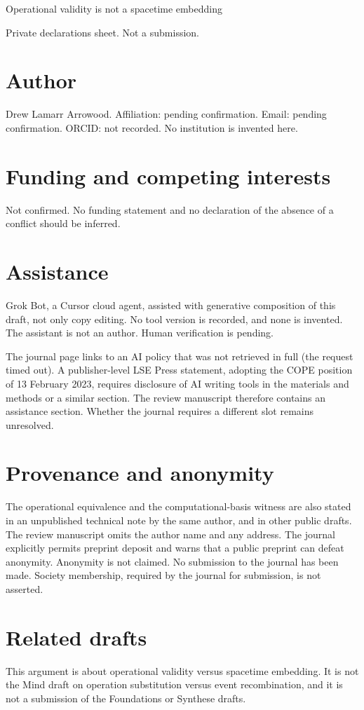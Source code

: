 \documentclass[11pt]{article}
\begin{document}
\begin{center}
{\Large Operational validity is not a spacetime embedding\par}
\vspace{1em}
Private declarations sheet. Not a submission.\par
\end{center}
\section*{Author}
Drew Lamarr Arrowood. Affiliation: pending confirmation. Email: pending confirmation. ORCID: not recorded. No institution is invented here.

\section*{Funding and competing interests}
Not confirmed. No funding statement and no declaration of the absence of a conflict should be inferred.

\section*{Assistance}
Grok Bot, a Cursor cloud agent, assisted with generative composition of this draft, not only copy editing. No tool version is recorded, and none is invented. The assistant is not an author. Human verification is pending.

The journal page links to an AI policy that was not retrieved in full (the request timed out). A publisher-level LSE Press statement, adopting the COPE position of 13 February 2023, requires disclosure of AI writing tools in the materials and methods or a similar section. The review manuscript therefore contains an assistance section. Whether the journal requires a different slot remains unresolved.

\section*{Provenance and anonymity}
The operational equivalence and the computational-basis witness are also stated in an unpublished technical note by the same author, and in other public drafts. The review manuscript omits the author name and any address. The journal explicitly permits preprint deposit and warns that a public preprint can defeat anonymity. Anonymity is not claimed. No submission to the journal has been made. Society membership, required by the journal for submission, is not asserted.

\section*{Related drafts}
This argument is about operational validity versus spacetime embedding. It is not the Mind draft on operation substitution versus event recombination, and it is not a submission of the Foundations or Synthese drafts.
\end{document}
